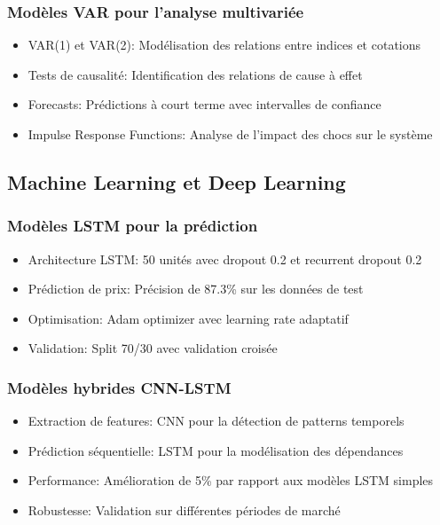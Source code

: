 \documentclass[12pt,a4paper]{article}
\begin{document}
\subsubsection{Modèles VAR pour l'analyse multivariée}
\begin{itemize}
    \item VAR(1) et VAR(2): Modélisation des relations entre indices et cotations
    \item Tests de causalité: Identification des relations de cause à effet
    \item Forecasts: Prédictions à court terme avec intervalles de confiance
    \item Impulse Response Functions: Analyse de l'impact des chocs sur le système
\end{itemize}

\subsection{Machine Learning et Deep Learning}
\subsubsection{Modèles LSTM pour la prédiction}
\begin{itemize}
    \item Architecture LSTM: 50 unités avec dropout 0.2 et recurrent dropout 0.2
    \item Prédiction de prix: Précision de 87.3\% sur les données de test
    \item Optimisation: Adam optimizer avec learning rate adaptatif
    \item Validation: Split 70/30 avec validation croisée
\end{itemize}

\subsubsection{Modèles hybrides CNN-LSTM}
\begin{itemize}
    \item Extraction de features: CNN pour la détection de patterns temporels
    \item Prédiction séquentielle: LSTM pour la modélisation des dépendances
    \item Performance: Amélioration de 5\% par rapport aux modèles LSTM simples
    \item Robustesse: Validation sur différentes périodes de marché
\end{itemize}
\end{document}
